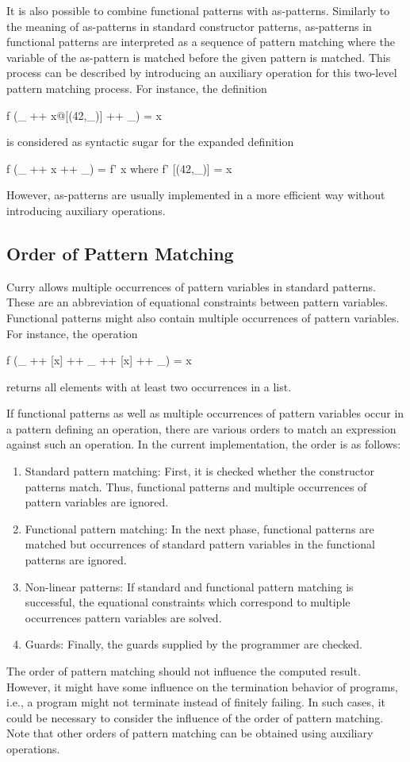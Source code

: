 %
It is also possible to combine functional patterns with
as-patterns.
Similarly to the meaning of as-patterns
in standard constructor patterns,
as-patterns in functional patterns are interpreted
as a sequence of pattern matching where the variable of the as-pattern
is matched before the given pattern is matched.
This process can be described by introducing an auxiliary operation
for this two-level pattern matching process.
For instance, the definition
\begin{curry}
f (_ ++ x@[(42,_)] ++ _) = x
\end{curry}
is considered as syntactic sugar for the expanded definition
\begin{curry}
f (_ ++ x ++ _) = f' x
 where
  f' [(42,_)] = x
\end{curry}
However, as-patterns are usually implemented
in a more efficient way without introducing auxiliary operations.

\subsection{Order of Pattern Matching}

Curry allows multiple occurrences of pattern variables
in standard patterns. These are an abbreviation of equational constraints
between pattern variables.
Functional patterns might also contain multiple occurrences of
pattern variables.
For instance, the operation
\begin{curry}
f (_ ++ [x] ++ _ ++ [x] ++ _) = x
\end{curry}
returns all elements with at least two occurrences in a list.

If functional patterns as well as multiple occurrences of
pattern variables occur in a pattern defining an operation,
there are various orders to match an expression against such
an operation. In the current implementation, the order
is as follows:
\begin{enumerate}
\item Standard pattern matching: First, it is checked whether
the constructor patterns match. Thus, functional patterns
and multiple occurrences of pattern variables are ignored.
\item Functional pattern matching: In the next phase,
functional patterns are matched but occurrences of standard
pattern variables in the functional patterns are ignored.
\item Non-linear patterns: If standard and functional pattern matching
is successful, the equational constraints which correspond
to multiple occurrences pattern variables are solved.
\item Guards: Finally, the guards supplied by the programmer
are checked.
\end{enumerate}
The order of pattern matching should not influence the computed
result. However, it might have some influence on the termination
behavior of programs, i.e., a program might not terminate
instead of finitely failing.
In such cases, it could be necessary to consider the influence
of the order of pattern matching. Note that other orders of pattern matching
can be obtained using auxiliary operations.


